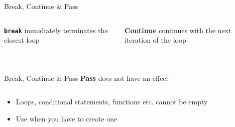         \begin{frame}{Break, Continue \& Pass}
            \begin{columns}
                \begin{column}{0.5\textwidth}
                    \textbf{\texttt{break}} immidiately terminates the closest loop
                    \bigskip  
                    \inputminted[frame=single,framesep=2pt]{python3}{code-examples/break1.py}
                    \pause
                    \inputminted[frame=single,framesep=2pt]{python3}{code-examples/break2.py}
                \end{column}
               \pause 
                \begin{column}{0.5\textwidth}
                    \textbf{Continue}
                    continues with the next iteration of the loop
                    \bigskip  
                    \inputminted[frame=single,framesep=2pt]{python3}{code-examples/continue1.py}
                    \pause
                    \inputminted[frame=single,framesep=2pt]{python3}{code-examples/continue2.py}
                \end{column} 
            \end{columns}
        \end{frame}
        
        \begin{frame}{Break, Continue \& Pass}
            \textbf{Pass}
            does not have an effect
            \bigskip  
            \inputminted[frame=single,framesep=2pt]{python3}{code-examples/pass.py}
            \begin{itemize}
                \item Loops, conditional statements, functions etc. cannot be empty 
                \item Use when you have to create one
            \end{itemize}
        \end{frame}

